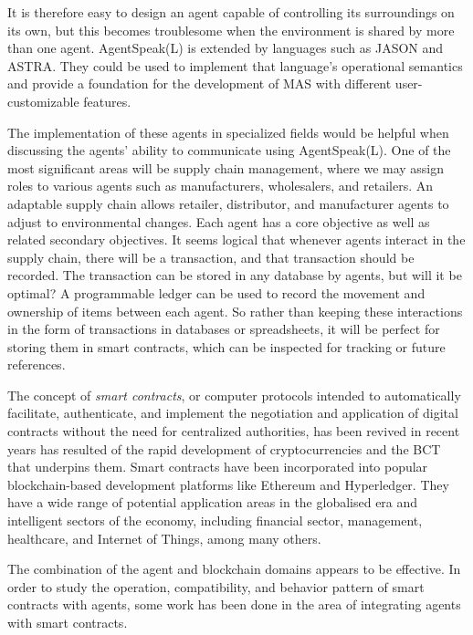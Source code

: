 It is therefore easy to design an agent capable of controlling its surroundings on its own, but this becomes troublesome when the environment is shared by more than one agent. AgentSpeak(L) is extended by languages such as JASON and \ac{ASTRA}. They could be used to implement that language's operational semantics and provide a foundation for the development of \ac{MAS} with different user-customizable features.

\vspace{.5cm}

The implementation of these agents in specialized fields would be helpful when discussing the agents' ability to communicate using AgentSpeak(L). One of the most significant areas will be supply chain management, where we may assign roles to various agents such as manufacturers, wholesalers, and retailers. An adaptable supply chain allows retailer, distributor, and manufacturer agents to adjust to environmental changes. Each agent has a core objective as well as related secondary objectives. It seems logical that whenever agents interact in the supply chain, there will be a transaction, and that transaction should be recorded. The transaction can be stored in any database by agents, but will it be optimal? A programmable ledger can be used to record the movement and ownership of items between each agent. So rather than keeping these interactions in the form of transactions in databases or spreadsheets, it will be perfect for storing them in smart contracts, which can be inspected for tracking or future references. 

\vspace{.5cm}

The concept of \textit{smart contracts}, or computer protocols intended to automatically facilitate, authenticate, and implement the negotiation and application of digital contracts without the need for centralized authorities, has been revived in recent years has resulted of the rapid development of cryptocurrencies and the \ac{BCT} that underpins them. Smart contracts have been incorporated into popular blockchain-based development platforms like Ethereum and Hyperledger. They have a wide range of potential application areas in the globalised era and intelligent sectors of the economy, including financial sector, management, healthcare, and Internet of Things, among many others.

\vspace{.5cm}

The combination of the agent and blockchain domains appears to be effective. In order to study the operation, compatibility, and behavior pattern of smart contracts with agents, some work has been done in the area of integrating agents with smart contracts.

